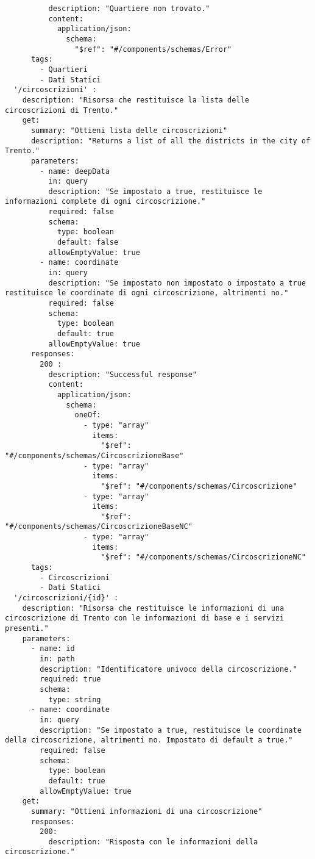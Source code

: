 \begin{verbatim}
          description: "Quartiere non trovato."
          content: 
            application/json: 
              schema: 
                "$ref": "#/components/schemas/Error"
      tags:
        - Quartieri
        - Dati Statici
  '/circoscrizioni' : 
    description: "Risorsa che restituisce la lista delle circoscrizioni di Trento."
    get: 
      summary: "Ottieni lista delle circoscrizioni"
      description: "Returns a list of all the districts in the city of Trento."
      parameters:
        - name: deepData
          in: query
          description: "Se impostato a true, restituisce le informazioni complete di ogni circoscrizione."
          required: false
          schema:
            type: boolean
            default: false
          allowEmptyValue: true
        - name: coordinate
          in: query
          description: "Se impostato non impostato o impostato a true restituisce le coordinate di ogni circoscrizione, altrimenti no."
          required: false
          schema:
            type: boolean
            default: true
          allowEmptyValue: true
      responses:
        200 :
          description: "Successful response"
          content:
            application/json:
              schema: 
                oneOf:
                  - type: "array"
                    items: 
                      "$ref": "#/components/schemas/CircoscrizioneBase"
                  - type: "array"
                    items: 
                      "$ref": "#/components/schemas/Circoscrizione"
                  - type: "array"
                    items: 
                      "$ref": "#/components/schemas/CircoscrizioneBaseNC"
                  - type: "array"
                    items: 
                      "$ref": "#/components/schemas/CircoscrizioneNC"
      tags:
        - Circoscrizioni
        - Dati Statici
  '/circoscrizioni/{id}' :
    description: "Risorsa che restituisce le informazioni di una circoscrizione di Trento con le informazioni di base e i servizi presenti."
    parameters:
      - name: id
        in: path
        description: "Identificatore univoco della circoscrizione."
        required: true
        schema:
          type: string
      - name: coordinate
        in: query
        description: "Se impostato a true, restituisce le coordinate della circoscrizione, altrimenti no. Impostato di default a true."
        required: false
        schema:
          type: boolean
          default: true
        allowEmptyValue: true
    get: 
      summary: "Ottieni informazioni di una circoscrizione"
      responses: 
        200:
          description: "Risposta con le informazioni della circoscrizione."

\end{verbatim}
